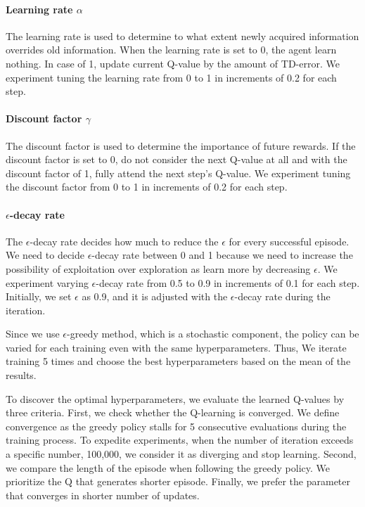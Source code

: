 \documentclass{article}
\begin{document}
\paragraph{Learning rate $\alpha$}
The learning rate is used to determine to what extent newly acquired information overrides old information. When the learning rate is set to 0, the agent learn nothing. In case of 1, update current Q-value by the amount of TD-error. We experiment tuning the learning rate from 0 to 1 in increments of 0.2 for each step.

\paragraph{Discount factor $\gamma$} The discount factor is used to determine the importance of future rewards. If the discount factor is set to 0, do not consider the next Q-value at all and with the discount factor of 1, fully attend the next step's Q-value. We experiment tuning the discount factor from 0 to 1 in increments of 0.2 for each step.

\paragraph{$\epsilon$-decay rate} The $\epsilon$-decay rate decides how much to reduce the $\epsilon$ for every successful episode. We need to decide $\epsilon$-decay rate between 0 and 1 because we need to increase the possibility of exploitation over exploration as learn more by decreasing $\epsilon$. We experiment varying $\epsilon$-decay rate from 0.5 to 0.9 in increments of 0.1 for each step. Initially, we set $\epsilon$ as 0.9, and it is adjusted with the $\epsilon$-decay rate during the iteration.

Since we use $\epsilon$-greedy method, which is a stochastic component, the policy can be varied for each training even with the same hyperparameters. Thus, We iterate training 5 times and choose the best hyperparameters based on the mean of the results.

To discover the optimal hyperparameters, we evaluate the learned Q-values by three criteria. First, we check whether the Q-learning is converged. We define convergence as the greedy policy stalls for 5 consecutive evaluations during the training process. To expedite experiments, when the number of iteration exceeds a specific number, 100,000, we consider it as diverging and stop learning. Second, we compare the length of the episode when following the greedy policy. We prioritize the Q that generates shorter episode. Finally, we prefer the parameter that converges in shorter number of updates.
\end{document}
